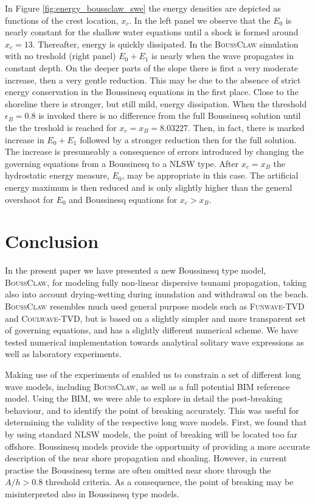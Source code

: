 \documentclass[review]{elsarticle}
\newcommand{\BoussClaw}{\textsc{BoussClaw} }
\newcommand{\BoussClawt}{\textsc{BoussClaw}}
\begin{document}
In Figure \ref{fig:energy_boussclaw_swe} the energy densities are depicted as 
functions of the crest location, $x_c$. 
In the left panel 
we observe that the $E_0$ is nearly constant 
for the shallow water equations until a shock is formed around $x_c=13$.
Thereafter, energy is quickly dissipated. 
In  the \BoussClaw simulation with no treshold (right panel) 
$E_0+E_1$ is nearly when the wave propagates in constant depth. 
On the deeper parts of the slope there is first a very moderate increase, then a
very gentle reduction. This may be due to the absence of strict energy  conservation in the Boussinesq equations in the first place. 
Close to the shoreline there is stronger, but still mild, energy dissipation.
When the threshold $\epsilon_B=0.8$ is invoked there is no difference from the full Boussinesq solution until the the treshold is reached for 
 $x_c=x_B=8.03227$. Then, in fact, there is marked increase in $E_0+E_1$ followed by a stronger  reduction then for the full solution.
The increase is presumeably a consequence of errors introduced by changing the 
governing equations from a Boussinesq to a NLSW type. 
After  $x_c=x_B$  
the hydrostatic energy measure, $E_0$, may be appropriate in this case.
The artificial energy maximum  is then reduced and is only slightly higher than
the general overshoot for $E_0$ and Boussinesq equations for $x_c>x_B$.  

\section{Conclusion}
\label{sec:conclusion}

In the present paper we have presented a new  
Boussinesq type model, \BoussClawt,
for modeling fully non-linear dispersive tsunami propagation, taking also into account drying-wetting during inundation and withdrawal on the beach.
\BoussClaw resembles much used general purpose models such as \textsc{Funwave-TVD} and
\textsc{Coulwave-TVD}, but is based on a slightly simpler and more transparent set of governing equations,
and has a slightly different numerical scheme. We have tested numerical implementation towards
analytical solitary wave expressions as well as laboratory experiments.

Making use of the experiments of \citet{synolakis1987runup} 
enabled us to
constrain a set of different long wave models, including \BoussClawt, as well as a full potential
BIM reference model. Using the BIM, we were able to explore in detail the post-breaking behaviour,
and to identify the point of breaking accurately. This was useful for determining the 
validity of the respective long wave models. First, we found that by using standard NLSW models,
the point of breaking will be located too far offshore. Boussinesq models
provide the opportunity of providing a more accurate description of the near shore propagation and shoaling. 
However, in current practise the Boussinesq terms are often omitted near shore through the $A/h>0.8$ threshold criteria.
As a consequence, the point of breaking may be misinterpreted also in Boussinesq type models.
\end{document}

